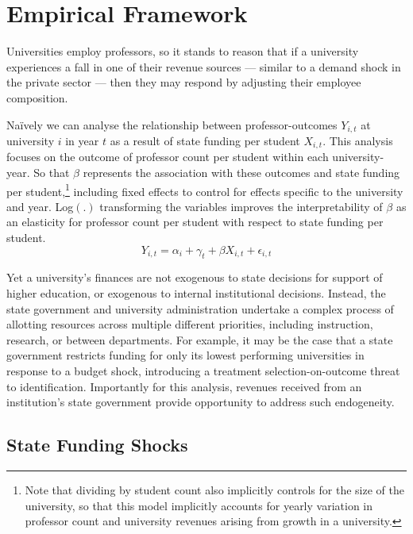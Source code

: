 \section{Empirical Framework}
\label{sec:empirics}

Universities employ professors, so it stands to reason that if a university experiences a fall in one of their revenue sources --- similar to a demand shock in the private sector --- then they may respond by adjusting their employee composition.

Na\"ively we can analyse the relationship between professor-outcomes $Y_{i,t}$ at university $i$ in year $t$ as a result of state funding per student $X_{i,t}$.
This analysis focuses on the outcome of professor count per student within each university-year.
So that $\beta$ represents the association with these outcomes and state funding per student,\footnote{
    Note that dividing by student count also implicitly controls for the size of the university, so that this model implicitly accounts for yearly variation in professor count and university revenues arising from growth in a university.
}
including fixed effects to control for effects specific to the university and year.
Log$(.)$ transforming the variables improves the interpretability of $\beta$ as an elasticity for professor count per student with respect to state funding per student.
\begin{equation}
    \label{eqn:naivereg}
    Y_{i,t} = \alpha_i + \gamma_t + \beta X_{i,t} + \epsilon_{i,t}
\end{equation}

Yet a university's finances are not exogenous to state decisions for support of higher education, or exogenous to internal institutional decisions.
Instead, the state government and university administration undertake a complex process of allotting resources across multiple different priorities, including instruction, research, or between departments.
For example, it may be the case that a state government restricts funding for only its lowest performing universities in response to a budget shock, introducing a treatment selection-on-outcome threat to identification. 
Importantly for this analysis, revenues received from an institution's state government provide opportunity to address such endogeneity.


\subsection{State Funding Shocks}
\label{sec:approp-shocks}

